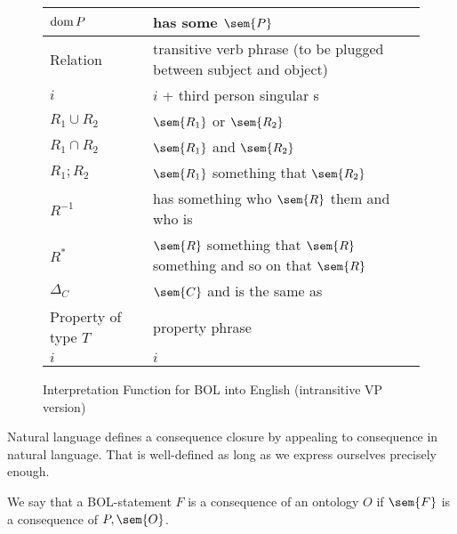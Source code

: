 \begin{figure}
\begin{tabular}{l|l}
$\mathrm{dom}\, P$ & has some $\sem{P}$\\
\hline
Relation & transitive verb phrase (to be plugged between subject and object)\\
$i$ & $i$ + third person singular s\\
$R_1 \cup R_2$ & $\sem{R_1}$ or $\sem{R_2}$\\
$R_1 \cap R_2$ & $\sem{R_1}$ and $\sem{R_2}$\\
$R_1 ; R_2$ & $\sem{R_1}$ something that $\sem{R_2}$\\
$R^{-1}$    & has something who $\sem{R}$ them and who is \\
$R^*$       & $\sem{R}$ something that $\sem{R}$ something and so on that $\sem{R}$\\
$\Delta_C$  & $\sem{C}$ and is the same as\\
\hline
Property of type $T$ & property phrase\\
$i$ & $i$\\
\end{tabular}
\caption{Interpretation Function for BOL into English (intransitive VP version)}\label{fig:bolsem:eng}
\end{figure}

Natural language defines a consequence closure by appealing to consequence in natural language.
That is well-defined as long as we express ourselves precisely enough.
\begin{definition}
We say that a BOL-statement $F$ is a consequence of an ontology $O$ if $\sem{F}$ is a consequence of $P,\sem{O}$.
\end{definition}

